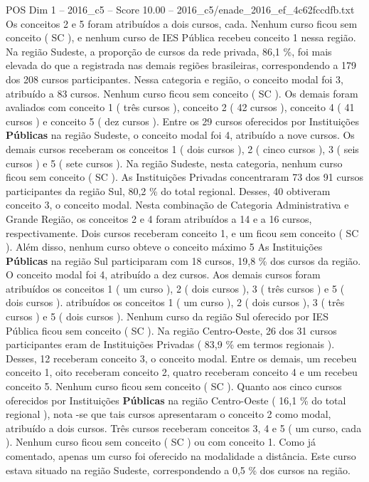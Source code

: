 \begin{textsample}{POS Dim 1 – 2016\_c5 – Score 10.00 – 2016\_c5/enade\_2016\_ef\_4c62fccdfb.txt}
Os conceitos 2 e 5 foram atribuídos a dois cursos, cada.
Nenhum curso ficou sem conceito ( SC ), e nenhum curso de IES Pública recebeu conceito 1 nessa região.
Na região Sudeste, a proporção de cursos da rede privada, 86,1 \%, foi mais elevada do que a registrada nas demais regiões brasileiras, correspondendo a 179 dos 208 cursos participantes.
Nessa categoria e região, o conceito modal foi 3, atribuído a 83 cursos.
Nenhum curso ficou sem conceito ( SC ).
Os demais foram avaliados com conceito 1 ( três cursos ), conceito 2 ( 42 cursos ), conceito 4 ( 41 cursos ) e conceito 5 ( dez cursos ).
Entre os 29 cursos oferecidos por Instituições \textbf{Públicas} na região Sudeste, o conceito modal foi 4, atribuído a nove cursos.
Os demais cursos receberam os conceitos 1 ( dois cursos ), 2 ( cinco cursos ), 3 ( seis cursos ) e 5 ( sete cursos ).
Na região Sudeste, nesta categoria, nenhum curso ficou sem conceito ( SC ).
As Instituições Privadas concentraram 73 dos 91 cursos participantes da região Sul, 80,2 \% do total regional.
Desses, 40 obtiveram conceito 3, o conceito modal.
Nesta combinação de Categoria Administrativa e Grande Região, os conceitos 2 e 4 foram atribuídos a 14 e a 16 cursos, respectivamente.
Dois cursos receberam conceito 1, e um ficou sem conceito ( SC ).
Além disso, nenhum curso obteve o conceito máximo 5 As Instituições \textbf{Públicas} na região Sul participaram com 18 cursos, 19,8 \% dos cursos da região.
O conceito modal foi 4, atribuído a dez cursos.
Aos demais cursos foram atribuídos os conceitos 1 ( um curso ), 2 ( dois cursos ), 3 ( três cursos ) e 5 ( dois cursos ). atribuídos os conceitos 1 ( um curso ), 2 ( dois cursos ), 3 ( três cursos ) e 5 ( dois cursos ).
Nenhum curso da região Sul oferecido por IES Pública ficou sem conceito ( SC ).
Na região Centro-Oeste, 26 dos 31 cursos participantes eram de Instituições Privadas ( 83,9 \% em termos regionais ).
Desses, 12 receberam conceito 3, o conceito modal.
Entre os demais, um recebeu conceito 1, oito receberam conceito 2, quatro receberam conceito 4 e um recebeu conceito 5.
Nenhum curso ficou sem conceito ( SC ).
Quanto aos cinco cursos oferecidos por Instituições \textbf{Públicas} na região Centro-Oeste ( 16,1 \% do total regional ), nota -se que tais cursos apresentaram o conceito 2 como modal, atribuído a dois cursos.
Três cursos receberam conceitos 3, 4 e 5 ( um curso, cada ).
Nenhum curso ficou sem conceito ( SC ) ou com conceito 1.
Como já comentado, apenas um curso foi oferecido na modalidade a distância.
Este curso estava situado na região Sudeste, correspondendo a 0,5 \% dos cursos na região.

\end{textsample}
